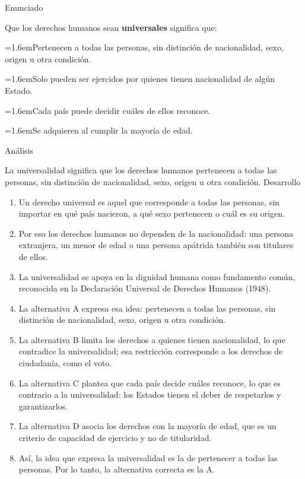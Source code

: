 \documentclass[10pt,a4paper,twocolumn]{article}
\newcommand{\alternativa}[2]{\par\noindent\hangindent=1.6em\hangafter=1\makebox[1.6em][l]{\tecla{#1}}#2\par}
\newcommand{\clave}[1]{\par\smallskip{\sffamily\footnotesize\color{esmeralda} Clave \teclaok{#1}}\par}
\begin{document}
\begin{ejemplo}
{\sffamily\footnotesize\color{zinc500} Enunciado}\par
Que los derechos humanos sean \textbf{universales} significa que:
\alternativa{A}{Pertenecen a todas las personas, sin distinción de nacionalidad, sexo, origen u otra condición.}
\alternativa{B}{Solo pueden ser ejercidos por quienes tienen nacionalidad de algún Estado.}
\alternativa{C}{Cada país puede decidir cuáles de ellos reconoce.}
\alternativa{D}{Se adquieren al cumplir la mayoría de edad.}
\clave{A}
{\sffamily\footnotesize\color{zinc500} Análisis}\par La universalidad significa que los derechos humanos pertenecen a todas las personas, sin distinción de nacionalidad, sexo, origen u otra condición.
{\sffamily\footnotesize\color{zinc500} Desarrollo}
\begin{enumerate}
  \item Un derecho universal es aquel que corresponde a todas las personas, sin importar en qué país nacieron, a qué sexo pertenecen o cuál es su origen.
  \item Por eso los derechos humanos no dependen de la nacionalidad: una persona extranjera, un menor de edad o una persona apátrida también son titulares de ellos.
  \item La universalidad se apoya en la dignidad humana como fundamento común, reconocida en la Declaración Universal de Derechos Humanos (1948).
  \item La alternativa A expresa esa idea: pertenecen a todas las personas, sin distinción de nacionalidad, sexo, origen u otra condición.
  \item La alternativa B limita los derechos a quienes tienen nacionalidad, lo que contradice la universalidad; esa restricción corresponde a los derechos de ciudadanía, como el voto.
  \item La alternativa C plantea que cada país decide cuáles reconoce, lo que es contrario a la universalidad: los Estados tienen el deber de respetarlos y garantizarlos.
  \item La alternativa D asocia los derechos con la mayoría de edad, que es un criterio de capacidad de ejercicio y no de titularidad.
  \item Así, la idea que expresa la universalidad es la de pertenecer a todas las personas. Por lo tanto, la alternativa correcta es la A.
\end{enumerate}
\end{ejemplo}
\end{document}
